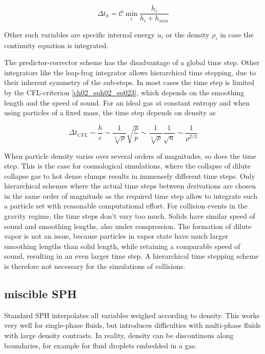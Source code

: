 \begin{equation}
\label{ch02_sph02_eq024}
\Delta t_{h} = \mathcal{C} \min_{i} \frac{\dot{h}_i}{h_i + h_{min}}
\end{equation}

Other such variables are specific internal energy $u_i$ or the density $\rho_i$ in case the continuity equation is integrated. 

The predictor-corrector scheme has the disadvantage of a global time step. Other integrators like the leap-frog integrator allows hierarchical time stepping, due to their inherent symmetry of the sub-steps. In most cases the time step is limited by the CFL-criterion \ref{ch02_sph02_eq023}, which depends on the smoothing length and the speed of sound. For an ideal gas at constant entropy and when using particles of a fixed mass, the time step depends on density as 

\begin{equation}
\label{ch02_sph02_eq025}
\Delta t_{CFL} \sim \frac{h}{c} \sim \frac{1}{\sqrt[3]{\rho}} \sqrt{ \frac{\rho}{p} } \sim \frac{1}{\sqrt[3]{\rho}} \frac{1}{\sqrt{u}} \sim \frac{1}{\rho^{2/3}}
\end{equation}

When particle density varies over several orders of magnitudes, so does the time step. This is the case for cosmological simulations, where the collapse of dilute collapse gas to hot dense clumps results in immensely different time steps. Only hierarchical schemes where the actual time steps between derivations are chosen in the same order of magnitude as the required time step allow to integrate such a particle set with reasonable computational effort.
For collision events in the gravity regime, the time steps don't vary too much. Solids have similar speed of sound and smoothing lengths, also under compression. The formation of dilute vapor is not an issue, because particles in vapor state have much larger smoothing lengths than solid length, while retaining a comparable speed of sound, resulting in an even larger time step. A hierarchical time stepping scheme is therefore not necessary for the simulations of collisions.


\subsection{miscible SPH}
Standard SPH interpolates all variables weighed according to density. This works very well for single-phase fluids, but introduces difficulties with multi-phase fluids with large density contrasts. In reality, density can be discontinous along boundaries, for example for fluid droplets embedded in a gas. 

